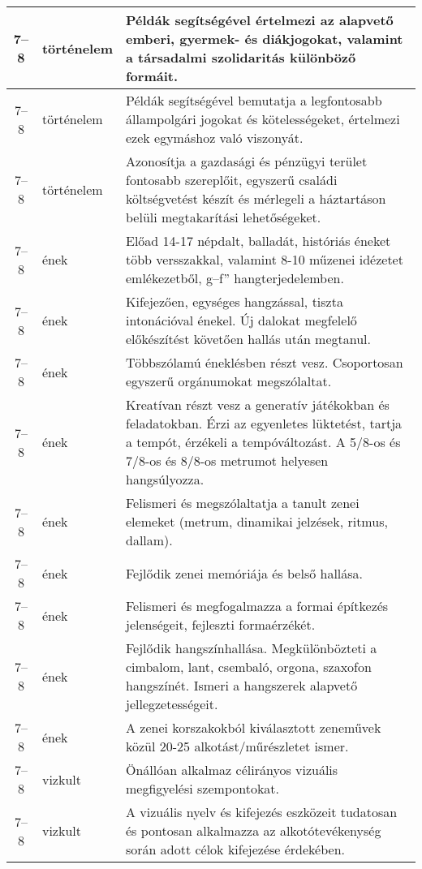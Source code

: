 \begin{small}
\begin{longtable}{c | p{2cm} |  p{11cm} }
              7--8 & történelem & Példák segítségével értelmezi az alapvető emberi, gyermek- és diákjogokat, valamint a társadalmi szolidaritás különböző formáit. \\ \hline
              7--8 & történelem & Példák segítségével bemutatja a legfontosabb állampolgári jogokat és kötelességeket, értelmezi ezek egymáshoz való viszonyát. \\ \hline
              7--8 & történelem & Azonosítja a gazdasági és pénzügyi terület fontosabb szereplőit, egyszerű családi költségvetést készít és mérlegeli a háztartáson belüli megtakarítási lehetőségeket. \\ \hline
              7--8 & ének & Előad 14-17 népdalt, balladát, históriás éneket több versszakkal, valamint 8-10 műzenei idézetet emlékezetből, g–f” hangterjedelemben. \\ \hline
              7--8 & ének & Kifejezően, egységes hangzással, tiszta intonációval énekel. Új dalokat megfelelő előkészítést követően hallás után megtanul. \\ \hline
              7--8 & ének & Többszólamú éneklésben részt vesz. Csoportosan egyszerű orgánumokat megszólaltat. \\ \hline
              7--8 & ének & Kreatívan  részt vesz a generatív játékokban és feladatokban. Érzi az egyenletes lüktetést, tartja a tempót, érzékeli a tempóváltozást. A 5/8-os és 7/8-os és 8/8-os metrumot helyesen hangsúlyozza. \\ \hline
              7--8 & ének & Felismeri és megszólaltatja a tanult zenei elemeket (metrum, dinamikai jelzések, ritmus, dallam). \\ \hline
              7--8 & ének & Fejlődik zenei memóriája és belső hallása. \\ \hline
              7--8 & ének & Felismeri és megfogalmazza a formai építkezés jelenségeit, fejleszti formaérzékét. \\ \hline
              7--8 & ének & Fejlődik hangszínhallása. Megkülönbözteti a cimbalom, lant, csembaló, orgona, szaxofon hangszínét. Ismeri a hangszerek alapvető jellegzetességeit. \\ \hline
              7--8 & ének & A zenei korszakokból kiválasztott zeneművek közül 20-25 alkotást/műrészletet ismer. \\ \hline
              7--8 & vizkult & Önállóan alkalmaz célirányos vizuális megfigyelési szempontokat. \\ \hline
              7--8 & vizkult & A vizuális nyelv és kifejezés eszközeit tudatosan és pontosan alkalmazza az alkotótevékenység során adott célok kifejezése érdekében. \\ \hline

\end{longtable}
\end{small}

